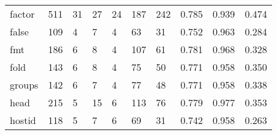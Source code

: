 \begin{longtable}{lp{2.0cm}p{2.0cm}p{2.0cm}p{2.0cm}p{2.0cm}p{2.0cm}p{2.0cm}p{2.0cm}p{2.0cm}}
factor    &                    511 &                                 31 &                                27 &                               24 &                               187 &                             242 &                                   0.785 &                                  0.939 &                                0.474 \\
false     &                    109 &                                  4 &                                 7 &                                4 &                                63 &                              31 &                                   0.752 &                                  0.963 &                                0.284 \\
fmt       &                    186 &                                  6 &                                 8 &                                4 &                               107 &                              61 &                                   0.781 &                                  0.968 &                                0.328 \\
fold      &                    143 &                                  6 &                                 8 &                                4 &                                75 &                              50 &                                   0.771 &                                  0.958 &                                0.350 \\
groups    &                    142 &                                  6 &                                 7 &                                4 &                                77 &                              48 &                                   0.771 &                                  0.958 &                                0.338 \\
head      &                    215 &                                  5 &                                15 &                                6 &                               113 &                              76 &                                   0.779 &                                  0.977 &                                0.353 \\
hostid    &                    118 &                                  5 &                                 7 &                                6 &                                69 &                              31 &                                   0.742 &                                  0.958 &                                0.263 \\

\end{longtable}

